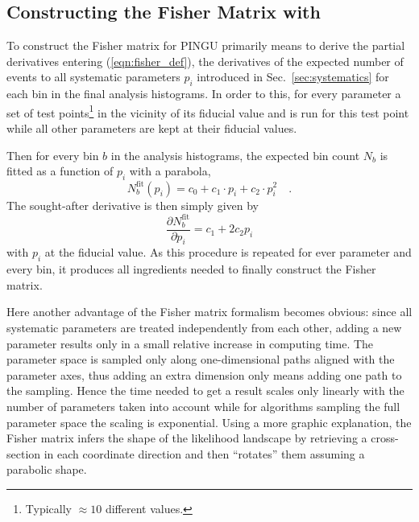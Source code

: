 \subsection{Constructing the Fisher Matrix with \papa}

To construct the Fisher matrix for PINGU primarily means to derive the partial
derivatives entering (\ref{eqn:fisher_def}), \ie the derivatives of the
expected number of events \wrt to all systematic parameters $p_i$ introduced in
Sec.~\ref{sec:systematics} for each bin in the final analysis histograms. In
order to this, for every parameter a set of test points\footnote{Typically
$\approx 10$ different values.} in the vicinity of its fiducial value and \papa
is run for this test point while all other parameters are kept at their fiducial
values.

Then for every bin $b$ in the analysis histograms, the expected bin count $N_b$
is fitted as a function of $p_i$ with a parabola, \ie
\begin{equation}
 N_b^\mathrm{fit}(p_i) = c_0 + c_1\cdot p_i + c_2\cdot p_i^2 \quad.
\end{equation}
The sought-after derivative is then simply given by
\begin{equation}
 \frac{\partial N_b^\mathrm{fit}}{\partial p_i} = c_1 + 2 c_2 p_i 
\end{equation}
with $p_i$ at the fiducial value. As this procedure is repeated for ever
parameter and every bin, it produces all ingredients needed to finally
construct the Fisher matrix.

Here another advantage of the Fisher matrix formalism becomes obvious: since
all systematic parameters are treated independently from each other, adding a
new parameter results only in a small relative increase in computing time.
The parameter space is sampled only along one-dimensional paths aligned with
the parameter axes, thus adding an extra dimension only means adding one path
to the sampling. Hence the time needed to get a result scales only linearly
with the number of parameters taken into account while for algorithms sampling
the full parameter space the scaling is exponential. Using a more graphic
explanation, the Fisher matrix infers the shape of the likelihood landscape by
retrieving a cross-section in each coordinate direction and then ``rotates''
them assuming a parabolic shape.